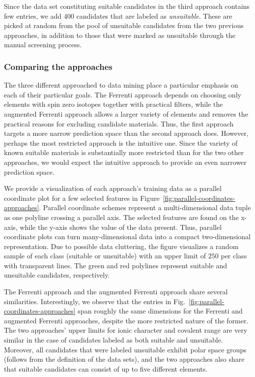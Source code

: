 \documentclass[superscriptaddress,unsortedaddress,
 amsmath,amssymb,
 aps,
]{revtex4-2}
\begin{document}
Since the data set constituting suitable candidates in the third approach contains few entries, we add $400$ candidates that are labeled as \emph{unsuitable}. These are picked at random from the pool of unsuitable candidates from the two previous approaches, in addition to those that were marked as unsuitable through the manual screening process. 

\subsubsection*{Comparing the approaches}
The three different approached to data mining place a particular emphasis on each of their particular goals. The Ferrenti approach depends on choosing only elements with spin zero isotopes together with practical filters, while the augmented Ferrenti approach allows a larger variety of elements and removes the practical reasons for excluding candidate materials. Thus, the first approach targets a more narrow prediction space than the second approach does. However, perhaps the most restricted approach is the intuitive one. Since the variety of known suitable materials is substantially more restricted than for the two other approaches, we would expect the intuitive approach to provide an even narrower prediction space. %

We provide a visualization of each approach's training data as a parallel coordinate plot for a few selected features in Figure~\ref{fig:parallel-coordinates-approaches}. Parallel coordinate schemes \cite{Inselberga1990, Inselberg1985} represent a multi-dimensional data tuple as one polyline crossing a parallel axis. The selected features are found on the x-axis, while the y-axis shows the value of the data present. Thus, parallel coordinate plots can turn many-dimensional data into a compact two-dimensional representation. Due to possible data cluttering, the figure visualizes a random sample of each class (suitable or unsuitable) with an upper limit of $250$ per class with transparent lines. The green and red polylines represent suitable and unsuitable candidates, respectively. 

The Ferrenti approach and the augmented Ferrenti approach share several similarities. 
Interestingly, we observe that the entries in Fig.~\ref{fig:parallel-coordinates-approaches} span roughly the same dimensions for the Ferrenti and augmented Ferrenti approaches, despite the more restricted nature of the former.  
The two approaches' upper limits for ionic character and covalent range are very similar in the case of candidates labeled as both suitable and unsuitable.   
Moreover, all candidates that were labeled unsuitable exhibit polar space groups (follows from the definition of the data sets), and the two approaches also share that suitable candidates can consist of up to five different elements. 
\end{document}
